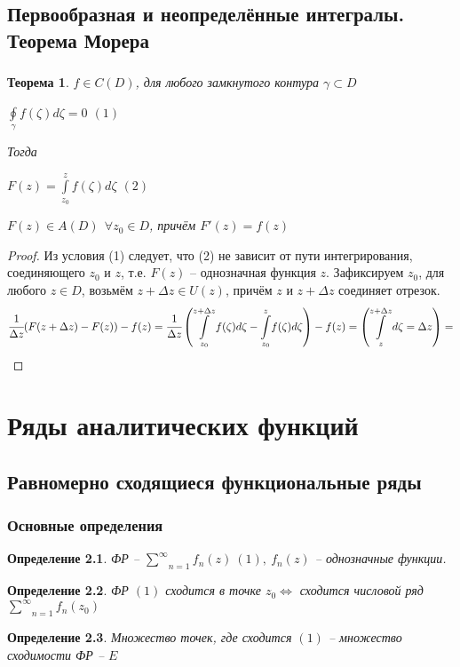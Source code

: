 \documentclass[draft]{report}
\newcommand{\mint}[2]{\underset{#1}{\overset{#2}{\int}}}
\newcommand{\moint}[1]{\underset{#1}{\oint}}
\newcommand{\msum}[2]{\underset{#1}{\overset{#2}{\sum}}}
\newcommand{\LRA}{\Leftrightarrow}
\newcommand{\g}{\gamma}
\newcommand{\D}{\Delta}
\newcommand{\F}{\ \forall}
\newcommand{\opr}[1]{\begin{opred}#1\end{opred}}
\newtheorem*{theor}{Теорема}
\newtheorem*{opred}{Определение}
\theoremstyle{remark}
\begin{document}
\section{Первообразная и неопределённые интегралы. Теорема Морера}

\subsection{ }

\begin{theor}
$f\in C(D)$, для любого замкнутого контура $\g\subset D$

$\moint{\g}f(\zeta)d\zeta=0$ $(1)$

Тогда

$F(z)=\mint{z_0}{z}f(\zeta)d\zeta$ $(2)$

$F(z)\in A(D)\ \F z_0\in D$, причём $F'(z)=f(z)$
\end{theor}
\begin{proof}
Из условия (1) следует, что (2) не зависит от пути интегрирования, соединяющего $z_0$ и $z$, т.е. $F(z)$ -- однозначная функция $z$.
Зафиксируем $z_0$, для любого $z\in D$, возьмём $z+\D z\in U(z)$, причём $z$ и $z+\D z$ соединяет отрезок.
$$
\cfrac{1}{\D z}(F(z+\D z)-F(z))-f(z) = \cfrac{1}{\D z}\left( \mint{z_0}{z+\D z}f(\zeta)d\zeta-\mint{z_0}{z}f(\zeta)d\zeta \right)-f(z) = \left( \mint{z}{z+\D z}d\zeta=\D z\right)=
$$
\end{proof}

\chapter{Ряды аналитических функций}

\section{Равномерно сходящиеся функциональные ряды}

\subsection{Основные определения}

\opr{ФР -- $\msum{n=1}{\infty}f_n(z)\ (1),\ f_n(z)$ -- однозначные функции.}

\opr{ФР $(1)$ сходится в точке $z_0\LRA$ сходится числовой ряд $\msum{n=1}{\infty}f_n(z_0)$}

\opr{Множество точек, где сходится $(1)$ -- множество сходимости ФР -- $E$}
\end{document}
